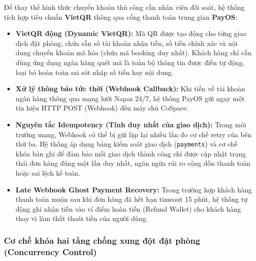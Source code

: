 Để thay thế hình thức chuyển khoản thủ công cần nhân viên đối soát, hệ thống tích hợp tiêu chuẩn \textbf{VietQR} thông qua cổng thanh toán trung gian \textbf{PayOS}:
\begin{itemize}
    \item \textbf{VietQR động (Dynamic VietQR):} Mã QR được tạo động cho từng giao dịch đặt phòng, chứa sẵn số tài khoản nhận tiền, số tiền chính xác và nội dung chuyển khoản mã hóa (chứa mã booking duy nhất). Khách hàng chỉ cần dùng ứng dụng ngân hàng quét mã là toàn bộ thông tin được điền tự động, loại bỏ hoàn toàn sai sót nhập số tiền hay nội dung.
    \item \textbf{Xử lý thông báo tức thời (Webhook Callback):} Khi tiền về tài khoản ngân hàng thông qua mạng lưới Napas 24/7, hệ thống PayOS gửi ngay một tín hiệu HTTP POST (Webhook) đến máy chủ CoSpace.
    \item \textbf{Nguyên tắc Idempotency (Tính duy nhất của giao dịch):} Trong môi trường mạng, Webhook có thể bị gửi lặp lại nhiều lần do cơ chế retry của bên thứ ba. Hệ thống áp dụng bảng kiểm soát giao dịch (\texttt{payments}) và cơ chế khóa bản ghi để đảm bảo mỗi giao dịch thành công chỉ được cập nhật trạng thái đơn hàng đúng một lần duy nhất, ngăn ngừa rủi ro cộng dồn thanh toán hoặc sai lệch kế toán.
    \item \textbf{Late Webhook Ghost Payment Recovery:} Trong trường hợp khách hàng thanh toán muộn sau khi đơn hàng đã hết hạn timeout 15 phút, hệ thống tự động ghi nhận tiền vào ví điểm hoàn tiền (Refund Wallet) cho khách hàng thay vì làm thất thoát tiền của người dùng.
\end{itemize}

\subsubsection{Cơ chế khóa hai tầng chống xung đột đặt phòng (Concurrency Control)}


